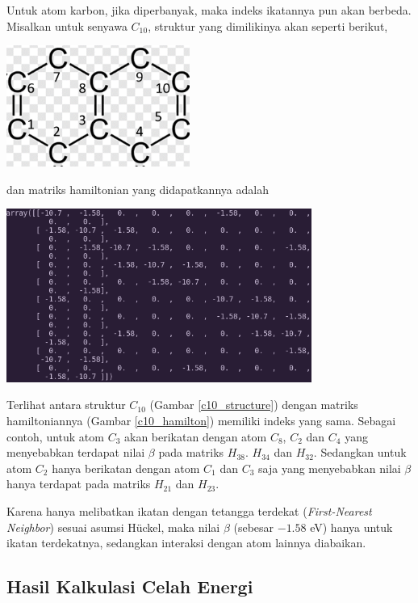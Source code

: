 \documentclass[12pt,a4paper]{report}
\begin{document}
Untuk atom karbon, jika diperbanyak, maka indeks ikatannya pun akan berbeda. Misalkan untuk senyawa $C_{10}$, struktur yang dimilikinya akan seperti berikut,
\begin{center}
	\includegraphics[width=6cm]{gambar/C10.png}
	\label{c10_structure}
\end{center}
dan matriks hamiltonian yang didapatkannya adalah
\begin{center}
	\includegraphics[width=10cm]{gambar/c10_hamiltonian.png}
	\label{c10_hamilton}
\end{center}

Terlihat antara struktur $C_{10}$ (Gambar \ref{c10_structure}) dengan matriks hamiltoniannya (Gambar \ref{c10_hamilton}) memiliki indeks yang sama. Sebagai contoh, untuk atom $C_{3}$ akan berikatan dengan atom $C_{8}$, $C_{2}$ dan $C_{4}$ yang menyebabkan terdapat nilai $\beta$ pada matriks $H_{38}$. $H_{34}$ dan $H_{32}$. Sedangkan untuk atom $C_{2}$ hanya berikatan dengan atom $C_{1}$ dan $C_{3}$ saja yang menyebabkan nilai $\beta$ hanya terdapat pada matriks $H_{21}$ dan $H_{23}$.

Karena hanya melibatkan ikatan dengan tetangga terdekat (\textit{First-Nearest Neighbor}) sesuai asumsi Hückel, maka nilai $\beta$ (sebesar $-1.58$ eV) hanya untuk ikatan terdekatnya, sedangkan interaksi dengan atom lainnya diabaikan.

\subsection{Hasil Kalkulasi Celah Energi}
\end{document}
